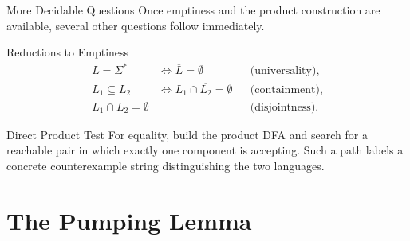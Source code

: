 \documentclass[10pt]{beamer}
\begin{document}
\begin{frame}{More Decidable Questions}
  \small
  Once emptiness and the product construction are available, several other
  questions follow immediately.
  \begin{block}{Reductions to Emptiness}
    \begin{align*}
      L=\Sigma^*
      &\Longleftrightarrow \overline{L}=\emptyset
      &&\text{(universality)},\\
      L_1\subseteq L_2
      &\Longleftrightarrow L_1\cap\overline{L_2}=\emptyset
      &&\text{(containment)},\\
      L_1\cap L_2=\emptyset
      &&&\text{(disjointness)}.
    \end{align*}
  \end{block}
  \pause
  \begin{exampleblock}{Direct Product Test}
    For equality, build the product DFA and search for a reachable pair in
    which exactly one component is accepting. Such a path labels a concrete
    counterexample string distinguishing the two languages.
  \end{exampleblock}
\end{frame}

\section{The Pumping Lemma}
\end{document}
